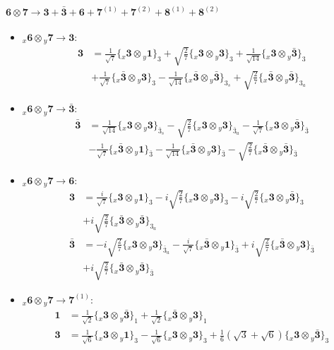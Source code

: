 \documentclass[english]{article}
\newcommand{\rep}[1]{\mathbf{#1}}
\newcommand{\repx}[2]{{}_{#2}\mathbf{#1}}
\newcommand{\subcg}[3]{\big\{ \repx{#1}{x}\otimes\repx{#2}{y}\big\}^{}_{#3}}
\begin{document}
\paragraph*{\Large $\rep{6}\otimes\rep{7}\to\rep{3}+\rep{\bar{3}}+\rep{6}+\rep{7}^{(1)}+\rep{7}^{(2)}+\rep{8}^{(1)}+\rep{8}^{(2)}$}
\begin{itemize}
\item $\repx{6}{x}\otimes\repx{7}{y}\to\rep{3}$:
\begin{align*}
\rep{3} & = \frac{1}{\sqrt{7}}\subcg{3}{1}{3}+\sqrt{\frac{2}{7}}\subcg{3}{3}{3}+\frac{1}{\sqrt{14}}\subcg{3}{\bar{3}}{3} \\ 
 & +\frac{1}{\sqrt{7}}\subcg{\bar{3}}{3}{3}-\frac{1}{\sqrt{14}}\subcg{\bar{3}}{\bar{3}}{3_{s}}+\sqrt{\frac{2}{7}}\subcg{\bar{3}}{\bar{3}}{3_{a}}
\end{align*}
\item $\repx{6}{x}\otimes\repx{7}{y}\to\rep{\bar{3}}$:
\begin{align*}
\rep{\bar{3}} & = \frac{1}{\sqrt{14}}\subcg{3}{3}{\bar{3}_{s}}-\sqrt{\frac{2}{7}}\subcg{3}{3}{\bar{3}_{a}}-\frac{1}{\sqrt{7}}\subcg{3}{\bar{3}}{\bar{3}} \\ 
 & -\frac{1}{\sqrt{7}}\subcg{\bar{3}}{1}{\bar{3}}-\frac{1}{\sqrt{14}}\subcg{\bar{3}}{3}{\bar{3}}-\sqrt{\frac{2}{7}}\subcg{\bar{3}}{\bar{3}}{\bar{3}}
\end{align*}
\item $\repx{6}{x}\otimes\repx{7}{y}\to\rep{6}$:
\begin{align*}
\rep{3} & = \frac{i}{\sqrt{7}}\subcg{3}{1}{3}-i \sqrt{\frac{2}{7}}\subcg{3}{3}{3}-i \sqrt{\frac{2}{7}}\subcg{3}{\bar{3}}{3} \\ 
 & +i \sqrt{\frac{2}{7}}\subcg{\bar{3}}{\bar{3}}{3_{a}}
\\
\rep{\bar{3}} & = -i \sqrt{\frac{2}{7}}\subcg{3}{3}{\bar{3}_{a}}-\frac{i}{\sqrt{7}}\subcg{\bar{3}}{1}{\bar{3}}+i \sqrt{\frac{2}{7}}\subcg{\bar{3}}{3}{\bar{3}} \\ 
 & +i \sqrt{\frac{2}{7}}\subcg{\bar{3}}{\bar{3}}{\bar{3}}
\end{align*}
\item $\repx{6}{x}\otimes\repx{7}{y}\to\rep{7}^{(1)}$:
\begin{align*}
\rep{1} & = \frac{1}{\sqrt{2}}\subcg{3}{\bar{3}}{1}+\frac{1}{\sqrt{2}}\subcg{\bar{3}}{3}{1}
\\
\rep{3} & = \frac{1}{\sqrt{6}}\subcg{3}{1}{3}-\frac{1}{\sqrt{6}}\subcg{3}{3}{3}+\frac{1}{6} \left(\sqrt{3}+\sqrt{6}\right)\subcg{3}{\bar{3}}{3} \\ 

\end{align*}
\end{itemize}
\end{document}
